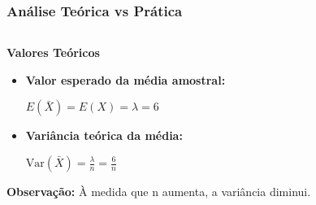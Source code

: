 \documentclass[aspectratio=169,12pt]{beamer}
\begin{document}
\begin{frame}
    \frametitle{Análise Teórica vs Prática}
    
    \begin{columns}
        \begin{column}{0.55\textwidth}
            \textbf{\Large Valores Teóricos}
            \vspace{0.5cm}
            
            \begin{itemize}
                \item[\faIcon{calculator}] \textbf{Valor esperado da média amostral:}
                
                \begin{center}
                    \colorbox{cinzaclaro}{\parbox{0.9\textwidth}{\centering $E(\bar{X}) = E(X) = \lambda = 6$}}
                \end{center}
                \vspace{0.3cm}
                
                \item[\faIcon{chart-line}] \textbf{Variância teórica da média:}
                
                \begin{center}
                    \colorbox{cinzaclaro}{\parbox{0.9\textwidth}{\centering $\text{Var}(\bar{X}) = \frac{\lambda}{n} = \frac{6}{n}$}}
                \end{center}
                \vspace{0.3cm}
            \end{itemize}
            
            \textcolor{azulprincipal}{\textbf{Observação:}} À medida que n aumenta, a variância diminui.
        \end{column}
        

\end{columns}
\end{frame}
\end{document}
